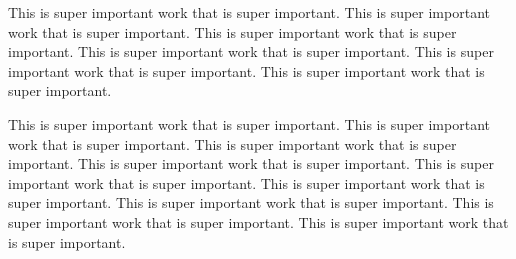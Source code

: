 
This is super important work that is super
important.
This is super important work that is super
important.
This is super important work that is super
important.
This is super important work that is super
important.
This is super important work that is super
important.
This is super important work that is super
important.

This is super important work that is super
important.
This is super important work that is super
important.
This is super important work that is super
important.
This is super important work that is super
important.
This is super important work that is super
important.
This is super important work that is super
important.
This is super important work that is super
important.
This is super important work that is super
important.
This is super important work that is super
important.
